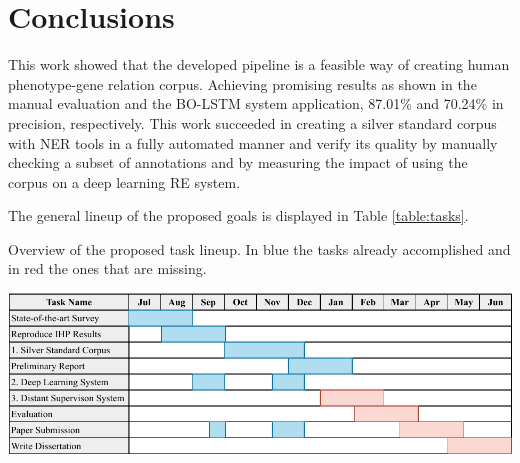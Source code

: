 \documentclass[11pt]{article}
\begin{document}
\section{Conclusions}

This work showed that the developed pipeline is a feasible way of creating human phenotype-gene relation corpus. Achieving promising results as shown in the manual evaluation and the BO-LSTM system application, 87.01\% and 70.24\% in precision, respectively. This work succeeded in creating a silver standard corpus with NER tools in a fully automated manner and verify its quality by manually checking a subset of annotations and by measuring the impact of using the corpus on a deep learning RE system.

The general lineup of the proposed goals is displayed in Table \ref{table:tasks}.

\begin{table}[!ht]
\captionsetup{font=small}
\renewcommand\thetable{5.1}
\caption{Overview of the proposed task lineup. In blue the tasks already accomplished and in red the ones that are missing.}
\centering
\includegraphics[width=\linewidth]{tasks.pdf}
\label{table:tasks}
\end{table}

\vspace{-10mm}

\pagebreak



\end{document}
